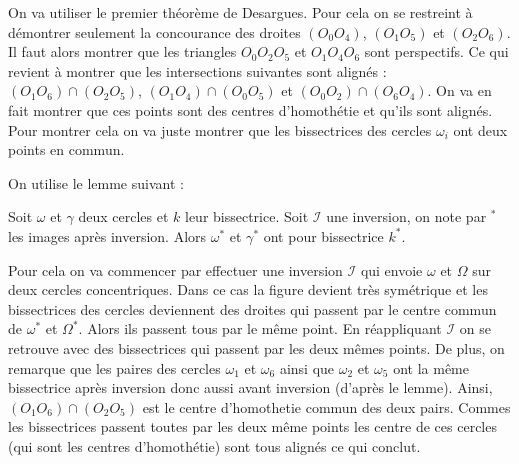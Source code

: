 \begin{sol}
On va utiliser le premier théorème de Desargues. Pour cela on se restreint à démontrer seulement la concourance des droites $(O_0O_4)$, $(O_1O_5)$ et $(O_2O_6)$. Il faut alors montrer que les triangles $O_0O_2O_5$ et $O_1O_4O_6$ sont perspectifs. Ce qui revient à montrer que les intersections suivantes sont alignés : $(O_1O_6)\cap(O_2O_5)$, $(O_1O_4)\cap (O_0O_5)$ et $(O_0O_2)\cap (O_6O_4)$. On va en fait montrer que ces points sont des centres d'homothétie et qu'ils sont alignés. Pour montrer cela on va juste montrer que les bissectrices des cercles $\omega_i$ ont deux points en commun.

On utilise le lemme suivant :

\begin{lem}
Soit $\omega$ et $\gamma$ deux cercles et $k$ leur bissectrice. Soit $\mathcal{I}$ une inversion, on note par $^*$ les images après inversion. Alors $\omega^*$ et $\gamma^*$ ont pour bissectrice $k^*$.
\end{lem}

Pour cela on va commencer par effectuer une inversion $\mathcal{I}$ qui envoie $\omega$ et $\Omega$ sur deux cercles concentriques. Dans ce cas la figure devient très symétrique et les bissectrices des cercles deviennent des droites qui passent par le centre commun de $\omega^*$ et $\Omega^*$. Alors ils passent tous par le même point. En réappliquant $\mathcal{I}$ on se retrouve avec des bissectrices qui passent par les deux mêmes points. De plus, on remarque que les paires des cercles $\omega_1$ et $\omega_6$ ainsi que $\omega_2$ et $\omega_5$ ont la même bissectrice après inversion donc aussi avant inversion (d'après le lemme). Ainsi, $(O_1O_6)\cap(O_2O_5)$ est le centre d'homothetie commun des deux pairs. Commes les bissectrices passent toutes par les deux même points les centre de ces cercles (qui sont les centres d'homothétie) sont tous alignés ce qui conclut.
\end{sol}

